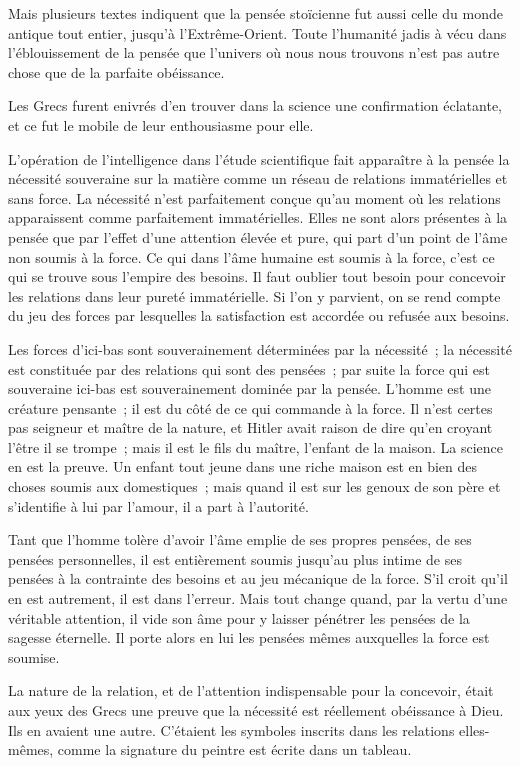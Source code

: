 \documentclass[french,twoside]{book} %
\begin{document}
Mais plusieurs textes indiquent que la pensée stoïcienne fut aussi celle du monde antique tout entier, jusqu'à l'Extrême-Orient. Toute l'humanité jadis à vécu dans l'éblouissement de la pensée que l'univers où nous nous trouvons n'est pas autre chose que de la parfaite obéissance.\par
Les Grecs furent enivrés d'en trouver dans la science une confirmation éclatante, et ce fut le mobile de leur enthousiasme pour elle.\par
L'opération de l'intelligence dans l'étude scientifique fait apparaître à la pensée la nécessité souveraine sur la matière comme un réseau de relations immatérielles et sans force. La nécessité n'est parfaitement conçue qu'au moment où les relations apparaissent comme parfaitement immatérielles. Elles ne sont alors présentes à la pensée que par l'effet d'une attention élevée et pure, qui part d'un point de l'âme non soumis à la force. Ce qui dans l'âme humaine est soumis à la force, c'est ce qui se trouve sous l'empire des besoins. Il faut oublier tout besoin pour concevoir les relations dans leur pureté immatérielle. Si l'on y parvient, on se rend compte du jeu des forces par lesquelles la satisfaction est accordée ou refusée aux besoins.\par
Les forces d'ici-bas sont souverainement déterminées par la nécessité ; la nécessité est constituée par des relations qui sont des pensées ; par suite la force qui est souveraine ici-bas est souverainement dominée par la pensée. L'homme est une créature pensante ; il est du côté de ce qui commande à la force. Il n'est certes pas seigneur et maître de la nature, et Hitler avait raison de dire qu'en croyant l'être il se trompe ; mais il est le fils du maître, l'enfant de la maison. La science en est la preuve. Un enfant tout jeune dans une riche maison est en bien des choses soumis aux domestiques ; mais quand il est sur les genoux de son père et s'identifie à lui par l'amour, il a part à l'autorité.\par
Tant que l'homme tolère d'avoir l'âme emplie de ses propres pensées, de ses pensées personnelles, il est entièrement soumis jusqu'au plus intime de ses pensées à la contrainte des besoins et au jeu mécanique de la force. S'il croit qu'il en est autrement, il est dans l'erreur. Mais tout change quand, par la vertu d'une véritable attention, il vide son âme pour y laisser pénétrer les pensées de la sagesse éternelle. Il porte alors en lui les pensées mêmes auxquelles la force est soumise.\par
La nature de la relation, et de l'attention indispensable pour la concevoir, était aux yeux des Grecs une preuve que la nécessité est réellement obéissance à Dieu. Ils en avaient une autre. C'étaient les symboles inscrits dans les relations elles-mêmes, comme la signature du peintre est écrite dans un tableau.\par
\end{document}

